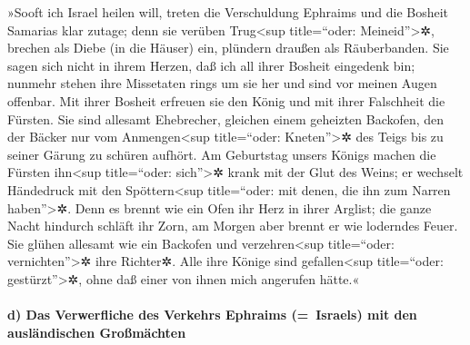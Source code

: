  »Sooft ich Israel heilen will, treten die Verschuldung
Ephraims und die Bosheit Samarias klar zutage; denn sie verüben
Trug\textless sup title=``oder: Meineid''\textgreater✲, brechen als
Diebe (in die Häuser) ein, plündern draußen als Räuberbanden.
 Sie sagen sich nicht in ihrem Herzen, daß ich all ihrer
Bosheit eingedenk bin; nunmehr stehen ihre Missetaten rings um sie her
und sind vor meinen Augen offenbar.  Mit ihrer Bosheit
erfreuen sie den König und mit ihrer Falschheit die Fürsten.
 Sie sind allesamt Ehebrecher, gleichen einem geheizten
Backofen, den der Bäcker nur vom Anmengen\textless sup title=``oder:
Kneten''\textgreater✲ des Teigs bis zu seiner Gärung zu schüren aufhört.
 Am Geburtstag unsers Königs machen die Fürsten
ihn\textless sup title=``oder: sich''\textgreater✲ krank mit der Glut
des Weins; er wechselt Händedruck mit den Spöttern\textless sup
title=``oder: mit denen, die ihn zum Narren haben''\textgreater✲.
 Denn es brennt wie ein Ofen ihr Herz in ihrer Arglist;
die ganze Nacht hindurch schläft ihr Zorn, am Morgen aber brennt er wie
loderndes Feuer.  Sie glühen allesamt wie ein Backofen und
verzehren\textless sup title=``oder: vernichten''\textgreater✲ ihre
Richter✲. Alle ihre Könige sind gefallen\textless sup title=``oder:
gestürzt''\textgreater✲, ohne daß einer von ihnen mich angerufen hätte.«

\hypertarget{d-das-verwerfliche-des-verkehrs-ephraims-israels-mit-den-ausluxe4ndischen-grouxdfmuxe4chten}{%
\paragraph{d) Das Verwerfliche des Verkehrs Ephraims (=~Israels) mit den
ausländischen
Großmächten}\label{d-das-verwerfliche-des-verkehrs-ephraims-israels-mit-den-ausluxe4ndischen-grouxdfmuxe4chten}}

